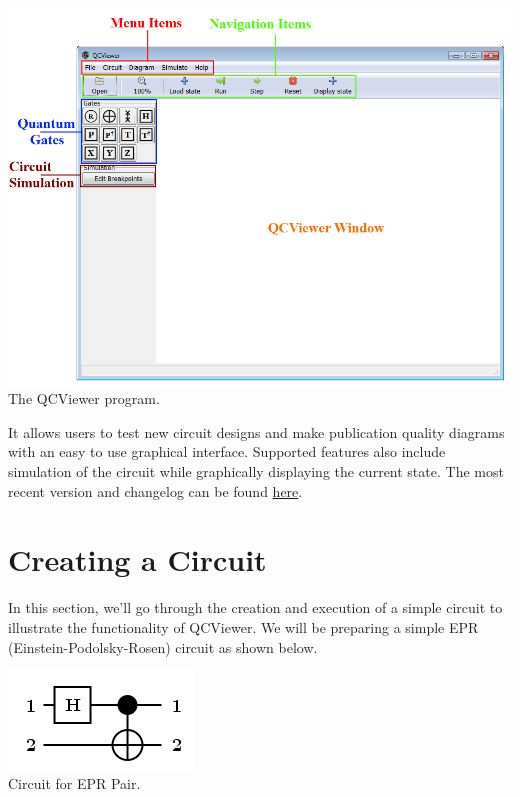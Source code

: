 \documentclass[10pt]{article}
\theoremstyle{definition}
\begin{document}
\begin{center}
\includegraphics[scale=0.50]{Figures/QCViewerGUI.png} \\
The QCViewer program.
\end{center}

It allows users to test new circuit designs and make publication quality diagrams with an easy to use graphical interface. Supported features also include simulation of the circuit while graphically displaying the current state. The most recent version and changelog can be found \href{http://qcirc.iqc.uwaterloo.ca/index.php?n=Projects.QCViewer}{here}. 

\section{Creating a Circuit} \label{sec:CreatingaCircuit}
In this section, we'll go through the creation and execution of a simple circuit to illustrate the functionality of QCViewer. We will be preparing a simple EPR (Einstein-Podolsky-Rosen) circuit as shown below.
\begin{center}
\includegraphics[scale=.7]{Figures/CreateCircuit/EPRCircuit}\\
Circuit for EPR Pair.
\end{center}
\end{document}
